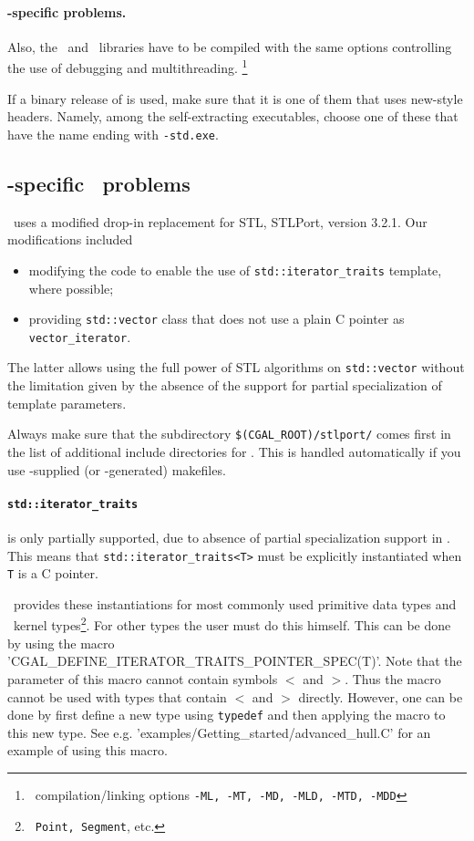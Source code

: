 \paragraph{\msvc-specific problems.}

Also, the \leda\ and \cgal\ libraries have to be compiled with the
same options controlling the use of debugging and multithreading.
\footnote{\msvc\ compilation/linking options \texttt{-ML, -MT, -MD,
    -MLD, -MTD, -MDD}}

If a binary release of \leda{} is used, make sure that it is one of
them that uses new-style headers. Namely, among the self-extracting
executables, choose one of these that have the name ending with
\texttt{-std.exe}.

\subsection{-specific \CC\ problems}

\cgal\ uses a modified drop-in replacement for STL, STLPort, version
3.2.1. Our modifications included
\begin{itemize}
\item modifying the code to enable
the use of \texttt{std::iterator\_traits} template, where possible;
\item providing \texttt{std::vector} class that does not use
a plain C pointer as \texttt{vector\_iterator}.
\end{itemize}
The latter allows using the full power of STL algorithms on
\texttt{std::vector} without the limitation given by the absence
of the support for partial specialization of template parameters.

Always make sure that the subdirectory
\texttt{\$(CGAL\_ROOT)/stlport/} %
comes first in the list of additional include directories for \msvc.
This is handled automatically if you use \cgal-supplied (or \cgal-generated)
makefiles.


\paragraph{\texttt{std::iterator\_traits}} is only partially
supported, due to absence of partial specialization support in \msvc.
This means that \texttt{std::iterator\_traits<T>} must be explicitly
instantiated when \texttt{T} is a C pointer. 

\cgal\ provides
these instantiations for most commonly used primitive data types and
\cgal\ kernel types\footnote{\cgal\ \texttt{Point, Segment}, etc.}.
For other types the user must do this himself.  
This can be done by using the macro
\nonlinkedpath'CGAL_DEFINE_ITERATOR_TRAITS_POINTER_SPEC(T)'.
Note that the parameter of this macro cannot contain symbols $<$ and
$>$. Thus the macro cannot be used with types that contain $<$ and $>$
directly. However, one can be done by first define a new type using 
\texttt{typedef} and then applying the macro to this new type.
See e.g. \nonlinkedpath'examples/Getting_started/advanced_hull.C'
for an example of using this macro.

